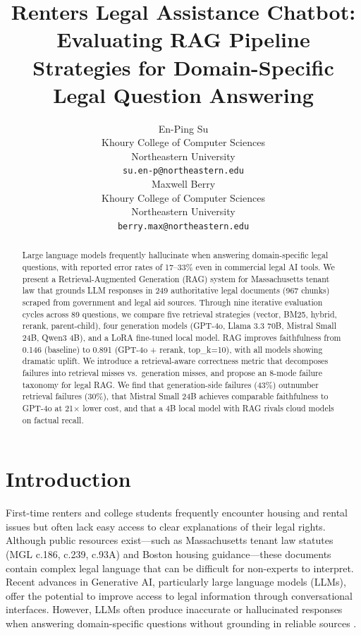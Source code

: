 \documentclass{article}
\title{Renters Legal Assistance Chatbot: Evaluating RAG Pipeline Strategies for Domain-Specific Legal Question Answering}
\author{%
  En-Ping Su \\
  Khoury College of Computer Sciences\\
  Northeastern University\\
  \texttt{su.en-p@northeastern.edu} \\
  \And
  Maxwell Berry \\
  Khoury College of Computer Sciences\\
  Northeastern University\\
  \texttt{berry.max@northeastern.edu} \\
}
\begin{document}
\maketitle

\begin{abstract}
Large language models frequently hallucinate when answering domain-specific legal questions, with reported error rates of 17--33\% even in commercial legal AI tools. We present a Retrieval-Augmented Generation (RAG) system for Massachusetts tenant law that grounds LLM responses in 249 authoritative legal documents (967 chunks) scraped from government and legal aid sources. Through nine iterative evaluation cycles across 89 questions, we compare five retrieval strategies (vector, BM25, hybrid, rerank, parent-child), four generation models (GPT-4o, Llama 3.3 70B, Mistral Small 24B, Qwen3 4B), and a LoRA fine-tuned local model. RAG improves faithfulness from 0.146 (baseline) to 0.891 (GPT-4o + rerank, top\_k=10), with all models showing dramatic uplift. We introduce a retrieval-aware correctness metric that decomposes failures into retrieval misses vs.\ generation misses, and propose an 8-mode failure taxonomy for legal RAG. We find that generation-side failures (43\%) outnumber retrieval failures (30\%), that Mistral Small 24B achieves comparable faithfulness to GPT-4o at 21$\times$ lower cost, and that a 4B local model with RAG rivals cloud models on factual recall.
\end{abstract}

\section{Introduction}
\label{sec:intro}

First-time renters and college students frequently encounter housing and rental issues but often lack easy access to clear explanations of their legal rights. Although public resources exist---such as Massachusetts tenant law statutes (MGL c.186, c.239, c.93A) and Boston housing guidance---these documents contain complex legal language that can be difficult for non-experts to interpret. Recent advances in Generative AI, particularly large language models (LLMs), offer the potential to improve access to legal information through conversational interfaces. However, LLMs often produce inaccurate or hallucinated responses when answering domain-specific questions without grounding in reliable sources \citep{magesh2025hallucination}.
\end{document}
